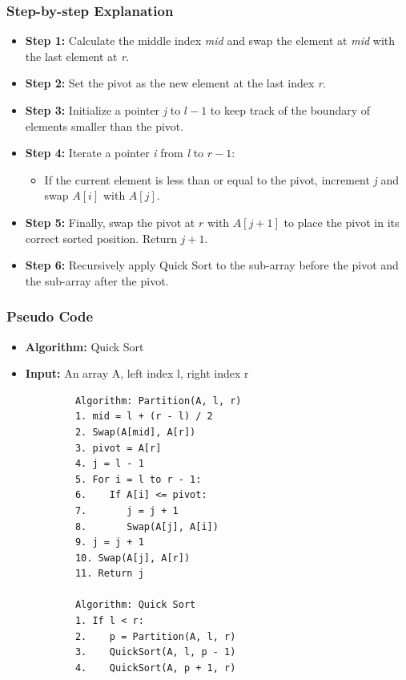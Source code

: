     \subsubsection{Step-by-step Explanation}
        \begin{itemize}
            \item \textbf{Step 1:} Calculate the middle index \textit{mid} and swap the element at \textit{mid} with the last element at \textit{r}.
            \item \textbf{Step 2:} Set the pivot as the new element at the last index \textit{r}.
            \item \textbf{Step 3:} Initialize a pointer \textit{j} to $l - 1$ to keep track of the boundary of elements smaller than the pivot.
            \item \textbf{Step 4:} Iterate a pointer \textit{i} from \textit{l} to $r - 1$:
            \begin{itemize}
                \item If the current element is less than or equal to the pivot, increment \textit{j} and swap $A[i]$ with $A[j]$.
            \end{itemize}
            \item \textbf{Step 5:} Finally, swap the pivot at $r$ with $A[j + 1]$ to place the pivot in its correct sorted position. Return $j + 1$.
            \item \textbf{Step 6:} Recursively apply Quick Sort to the sub-array before the pivot and the sub-array after the pivot.
        \end{itemize}
        
    \subsubsection{Pseudo Code}
        \begin{itemize}
            \item \textbf{Algorithm:} Quick Sort 
            \item \textbf{Input:} An array A, left index l, right index r
        \end{itemize}
        \begin{verbatim}
            Algorithm: Partition(A, l, r)
            1. mid = l + (r - l) / 2
            2. Swap(A[mid], A[r])
            3. pivot = A[r]
            4. j = l - 1
            5. For i = l to r - 1:
            6.    If A[i] <= pivot:
            7.       j = j + 1
            8.       Swap(A[j], A[i])
            9. j = j + 1
            10. Swap(A[j], A[r])
            11. Return j

            Algorithm: Quick Sort
            1. If l < r:
            2.    p = Partition(A, l, r)
            3.    QuickSort(A, l, p - 1)
            4.    QuickSort(A, p + 1, r)
        \end{verbatim}
